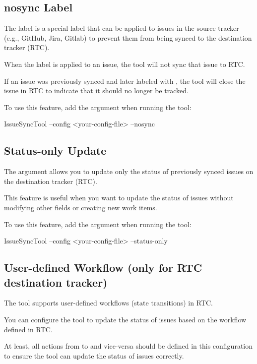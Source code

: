 \subsection{nosync Label}
The  label is a special label that can be applied to issues in the
source tracker (e.g., GitHub, Jira, Gitlab) to prevent them from being synced to
the destination tracker (RTC).

When the  label is applied to an issue, the tool will not sync that
issue to RTC.

If an issue was previously synced and later labeled with , the tool
will close the issue in RTC to indicate that it should no longer be tracked.

To use this feature, add the  argument when running the tool:

\begin{pythonlog}
IssueSyncTool --config <your-config-file> --nosync
\end{pythonlog}

\subsection{Status-only Update}
The  argument allows you to update only the status of
previously synced issues on the destination tracker (RTC).

This feature is useful when you want to update the status of issues without
modifying other fields or creating new work items.

To use this feature, add the  argument when running the tool:

\begin{pythonlog}
IssueSyncTool --config <your-config-file> --status-only
\end{pythonlog}

\newpage
\subsection{User-defined Workflow (only for RTC destination tracker)}
The tool supports user-defined workflows (state transitions) in RTC.

You can configure the tool to update the status of issues based on the workflow
defined in RTC.

At least, all actions from  to  and vice-versa should be
defined in this configuration to ensure the tool can update the status of issues
correctly.

